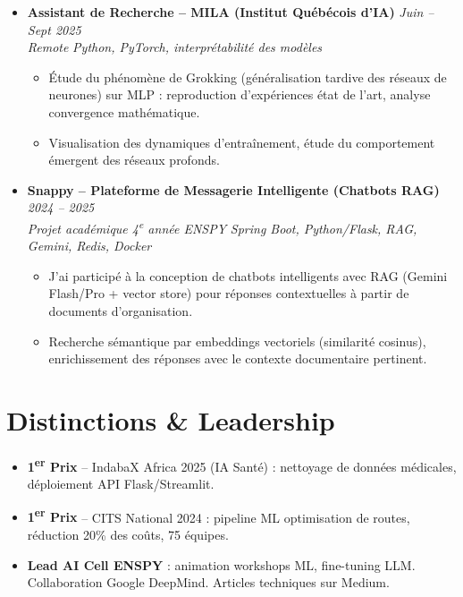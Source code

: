 \documentclass[a4paper,11pt]{article}
\begin{document}
\begin{itemize}[leftmargin=*, label={-}]
\item \textbf{Assistant de Recherche -- MILA (Institut Québécois d'IA)} \hfill \textit{Juin -- Sept 2025} \\
\textit{Remote} \hfill \textit{Python, PyTorch, interprétabilité des modèles}
\vspace{-2pt}
    \begin{itemize}[leftmargin=0.4cm, nosep, label=\tiny$\bullet$]
        \item \small{Étude du phénomène de Grokking (généralisation tardive des réseaux de neurones) sur MLP : reproduction d'expériences état de l'art, analyse convergence mathématique.}
        \item \small{Visualisation des dynamiques d'entraînement, étude du comportement émergent des réseaux profonds.}
    \end{itemize}
\vspace{3pt}

\item \textbf{Snappy -- Plateforme de Messagerie Intelligente (Chatbots RAG)} \hfill \textit{2024 -- 2025} \\
\textit{Projet académique 4\textsuperscript{e} année ENSPY} \hfill \textit{Spring Boot, Python/Flask, RAG, Gemini, Redis, Docker}
\vspace{-2pt}
    \begin{itemize}[leftmargin=0.4cm, nosep, label=\tiny$\bullet$]
        \item \small{J'ai participé à la conception de chatbots intelligents avec RAG (Gemini Flash/Pro + vector store) pour réponses contextuelles à partir de documents d'organisation.}
        \item \small{Recherche sémantique par embeddings vectoriels (similarité cosinus), enrichissement des réponses avec le contexte documentaire pertinent.}
    \end{itemize}
\vspace{3pt}

\end{itemize}

\section{Distinctions \& Leadership}
\begin{itemize}[leftmargin=*, nosep, label=\tiny$\bullet$]
    \item \small{\textbf{1\textsuperscript{er} Prix} -- IndabaX Africa 2025 (IA Santé) : nettoyage de données médicales, déploiement API Flask/Streamlit.}
    \item \small{\textbf{1\textsuperscript{er} Prix} -- CITS National 2024 : pipeline ML optimisation de routes, réduction 20\% des coûts, 75 équipes.}
    \item \small{\textbf{Lead AI Cell ENSPY} : animation workshops ML, fine-tuning LLM. Collaboration Google DeepMind. Articles techniques sur Medium.}
\end{itemize}
\end{document}

